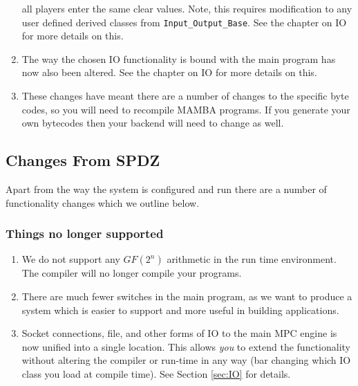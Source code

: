 \begin{enumerate}
all players enter the same clear values.
Note, this requires modification to any user defined 
derived classes from \verb+Input_Output_Base+.
See the chapter on IO for more details on this.
\item The way the chosen IO functionality is bound with the main program
has now also been altered. See the chapter on IO for more details on this.
\item These changes have meant there are a number of changes to the
specific byte codes, so you will need to recompile MAMBA programs.
If you generate your own bytecodes then your backend will need to
change as well.
\end{enumerate}


\subsection{Changes From SPDZ}
Apart from the way the system is configured and run there are
a number of functionality changes which we outline below.

\subsubsection{Things no longer supported}
\begin{enumerate}
\item We do not support any $GF(2^n)$ arithmetic in the run time 
environment. The compiler will no longer compile your programs.
\item There are much fewer switches in the main program, as we want
to produce a system which is easier to support and more useful in
building applications.
\item Socket connections, file, and other forms of IO to the main MPC
engine is now unified into a single location. This allows {\em you} to
extend the functionality without altering the compiler or
run-time in any way (bar changing which IO class you load
at compile time). See Section \ref{sec:IO} for details.
\end{enumerate}

